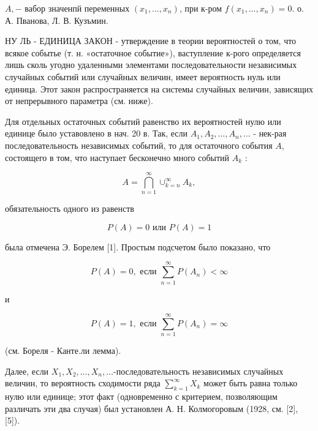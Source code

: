\documentclass[10pt]{article}
\begin{document}
$A,-$ вабор значенпй переменных $\left(x_{1}, \ldots, x_{n}\right)$, при к-ром $f\left(x_{1}, \ldots, x_{n}\right)=0$. о. А. Пванова, Л. В. Кузъмин.



НУ ЛЬ - ЕДИНИЦА ЗАКОН - утверждение в теории вероятностей о том, что всякое событье (т. н. «остаточное событие»), ваступление к-рого определяется лишь сколь угодно удаленными элементами последовательности независимых случайных событий или случайных величин, имеет вероятность нуль или единица. Этот закон распространяется на системы случайных величин, зависящих от непрерывного параметра (см. ниже).



Для отдельных остаточных событий равенство их вероятностей нулю или единице было уставовлено в нач. 20 в. Так, если $A_{1}, A_{2}, \ldots, A_{n}, \ldots$ - нек-рая последовательность независимых событий, то для остаточного события $A$, состоящего в том, что наступает бесконечно много событий $A_{k}$ :



\[

A=\bigcap_{n=1}^{\infty} \cup_{k=n}^{\infty} A_{k},

\]



обязательность одного из равенств



\[

P(A)=0 \text { или } P(A)=1

\]



была отмечена Э. Борелем [1]. Простым подсчетом было показано, что



\[

P(A)=0, \text { если } \sum_{n=1}^{\infty} P\left(A_{n}\right)<\infty

\]



и



\[

P(A)=1, \text { если } \sum_{n=1}^{\infty} P\left(A_{n}\right)=\infty

\]



(см. Бореля - Канте.ли лемма).



Далее, если $X_{1}, X_{2}, \ldots, X_{n}, \ldots$-последовательность независимых случайных величин, то вероятность сходимости ряда $\sum_{k=1}^{\infty} X_{k}$ может быть равна только нулю или единице; этот факт (одновременно с критерием, позволяющим различать эти два случая) был установлен А. Н. Колмогоровым (1928, см. [2], [5]).
\end{document}
